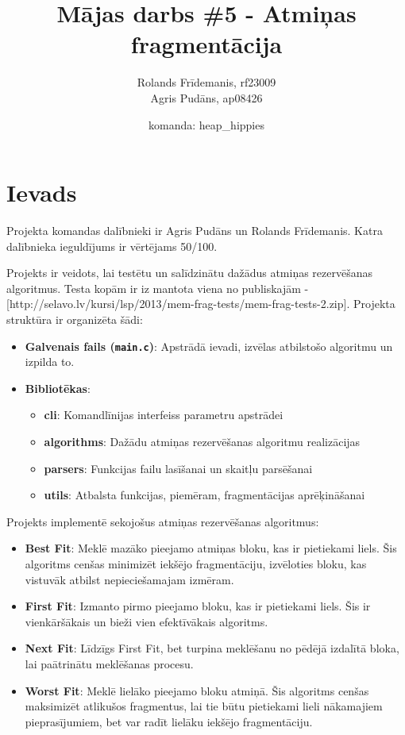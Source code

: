 \documentclass{report}
\title{Mājas darbs \#5 - Atmiņas fragmentācija}
\author{Rolands Frīdemanis, rf23009 \\ Agris Pudāns, ap08426}
\date{komanda: heap\_hippies}
\begin{document}
	
	\maketitle
	
	\tableofcontents
	
	\section{Ievads}
	
	Projekta komandas dalībnieki ir Agris Pudāns un Rolands Frīdemanis. Katra dalībnieka ieguldījums ir vērtējams 50/100.
	
	Projekts ir veidots, lai testētu un salīdzinātu dažādus atmiņas rezervēšanas algoritmus. Testa kopām ir iz mantota viena no publiskajām - [http://selavo.lv/kursi/lsp/2013/mem-frag-tests/mem-frag-tests-2.zip]. Projekta struktūra ir organizēta šādi:
	
	\begin{itemize}
		\item \textbf{Galvenais fails (\texttt{main.c})}: Apstrādā ievadi, izvēlas atbilstošo algoritmu un izpilda to.
		\item \textbf{Bibliotēkas}:
		\begin{itemize}
			\item \textbf{cli}: Komandlīnijas interfeiss parametru apstrādei
			\item \textbf{algorithms}: Dažādu atmiņas rezervēšanas algoritmu realizācijas
			\item \textbf{parsers}: Funkcijas failu lasīšanai un skaitļu parsēšanai
			\item \textbf{utils}: Atbalsta funkcijas, piemēram, fragmentācijas aprēķināšanai
		\end{itemize}
	\end{itemize}
	
	Projekts implementē sekojošus atmiņas rezervēšanas algoritmus:
	\begin{itemize}
		\item \textbf{Best Fit}: Meklē mazāko pieejamo atmiņas bloku, kas ir pietiekami liels. Šis algoritms cenšas minimizēt iekšējo fragmentāciju, izvēloties bloku, kas vistuvāk atbilst nepieciešamajam izmēram.
		\item \textbf{First Fit}: Izmanto pirmo pieejamo bloku, kas ir pietiekami liels. Šis ir vienkāršākais un bieži vien efektīvākais algoritms.
		\item \textbf{Next Fit}: Līdzīgs First Fit, bet turpina meklēšanu no pēdējā izdalītā bloka, lai paātrinātu meklēšanas procesu.
		\item \textbf{Worst Fit}: Meklē lielāko pieejamo bloku atmiņā. Šis algoritms cenšas maksimizēt atlikušos fragmentus, lai tie būtu pietiekami lieli nākamajiem pieprasījumiem, bet var radīt lielāku iekšējo fragmentāciju.
	\end{itemize}
	
\end{document}
